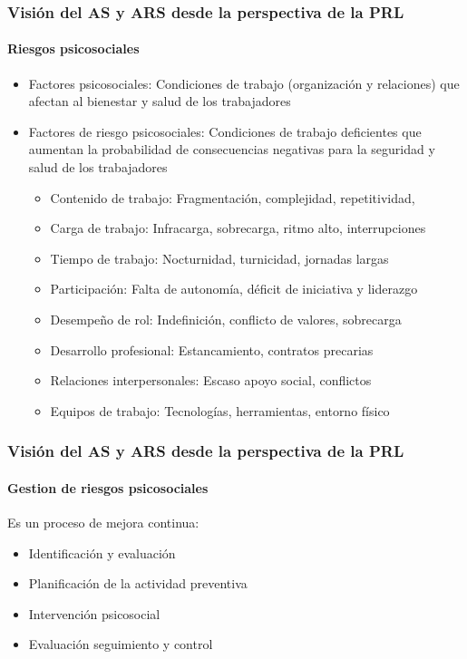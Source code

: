 \documentclass{beamer}
\newcommand{\highlight}[1]{{\color{Blue} #1}}
\begin{document}
    \begin{frame}
        \frametitle{Visión del AS y ARS desde la perspectiva de la PRL}
        \framesubtitle{Riesgos psicosociales}
        \begin{itemize}
            \item \highlight{Factores psicosociales}: Condiciones de trabajo (organización y relaciones) que afectan al bienestar y salud de los trabajadores
            \item \highlight{Factores de riesgo psicosociales}: Condiciones de trabajo deficientes que aumentan la probabilidad de consecuencias negativas para la seguridad y salud de los trabajadores
            \begin{itemize}
                \item \highlight{Contenido de trabajo}: Fragmentación, complejidad, repetitividad,
                \item \highlight{Carga de trabajo}: Infracarga, sobrecarga, ritmo alto, interrupciones
                \item \highlight{Tiempo de trabajo}: Nocturnidad, turnicidad, jornadas largas
                \item \highlight{Participación}: Falta de autonomía, déficit de iniciativa y liderazgo
                \item \highlight{Desempeño de rol}: Indefinición, conflicto de valores, sobrecarga
                \item \highlight{Desarrollo profesional}: Estancamiento, contratos precarias
                \item \highlight{Relaciones interpersonales}: Escaso apoyo social, conflictos
                \item \highlight{Equipos de trabajo}: Tecnologías, herramientas, entorno físico
            \end{itemize}
        \end{itemize}
    \end{frame}

    \begin{frame}
        \frametitle{Visión del AS y ARS desde la perspectiva de la PRL}
        \framesubtitle{Gestion de riesgos psicosociales}
        Es un proceso de mejora continua:
        \begin{itemize}
            \item Identificación y evaluación
            \item Planificación de la actividad preventiva
            \item Intervención psicosocial
            \item Evaluación seguimiento y control
        \end{itemize}
    \end{frame}
\end{document}
